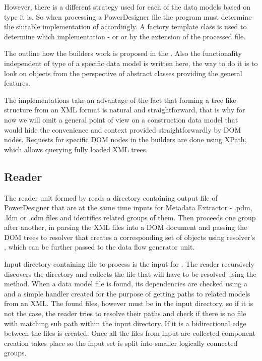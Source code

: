 However, there is a different strategy used for each of the data models based on type it is. So when processing a PowerDesigner file the program must determine the suitable implementation of  accordingly. 
A factory template class  is used to determine which implementation -  or  or  by the extension of the processed file.

The outline how the builders work is proposed in the . Also the functionality independent of type of a specific data model is written here, the way to do it is to look on objects from the perspective of abstract classes providing the general features.


The implementations take an advantage of the fact that forming a tree like structure from an XML format is natural and straightforward, that is why for now we will omit a general point of view on a construction data model that would hide the convenience and context provided straightforwardly by DOM nodes. 
Requests for specific DOM nodes in the builders are done using XPath, which allows querying fully loaded XML trees.

\subsection{Reader}

The reader unit formed by  reads a directory containing output file of PowerDesigner that are at the same time inputs for Metadata Extractor - .pdm, .ldm or .cdm files and identifies related groups of them. Then proceeds one group after another, in parsing the XML files into a DOM document and passing the DOM trees to resolver that creates a corresponding set of  objects using resolver's , which can be further passed to the data flow generator unit.
 
Input directory containing file to process is the input for . The reader recursively discovers the directory and collects the file that will have to be resolved using the  method. When a data model file is found, its dependencies are checked using a  and a simple handler  created for the purpose of getting paths to related models from an XML. The found files, however must be in the input directory, so if it is not the case, the reader tries to resolve their paths and check if there is no file with matching sub path within the input directory. If it is a bidirectional edge between the files is created. 
Once all the files from input are collected component creation takes place so the input set is split into smaller logically connected groups.

